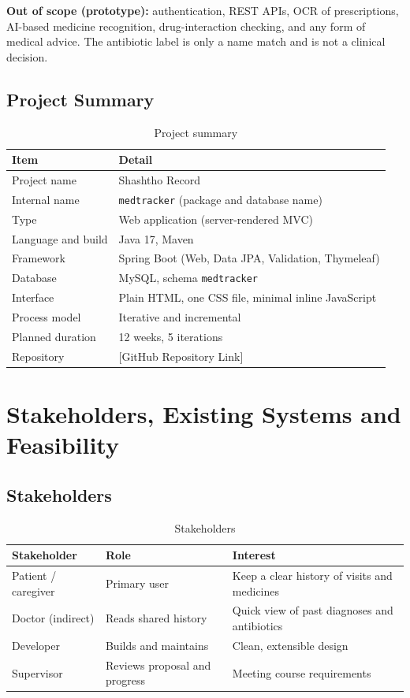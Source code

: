 \documentclass[11pt,a4paper]{article}
\begin{document}
\textbf{Out of scope (prototype):} authentication, REST APIs, OCR of prescriptions, AI-based medicine recognition, drug-interaction checking, and any form of medical advice. The antibiotic label is only a name match and is not a clinical decision.

\subsection{Project Summary}
\begin{table}[H]
\centering
\caption{Project summary}
\begin{tabularx}{\textwidth}{lY}
\toprule
\textbf{Item} & \textbf{Detail}\\
\midrule
Project name & Shashtho Record\\
Internal name & \texttt{medtracker} (package and database name)\\
Type & Web application (server-rendered MVC)\\
Language and build & Java 17, Maven\\
Framework & Spring Boot (Web, Data JPA, Validation, Thymeleaf)\\
Database & MySQL, schema \texttt{medtracker}\\
Interface & Plain HTML, one CSS file, minimal inline JavaScript\\
Process model & Iterative and incremental\\
Planned duration & 12 weeks, 5 iterations\\
Repository & [GitHub Repository Link]\\
\bottomrule
\end{tabularx}
\end{table}

\section{Stakeholders, Existing Systems and Feasibility}

\subsection{Stakeholders}
\begin{table}[H]
\centering
\caption{Stakeholders}
\begin{tabularx}{\textwidth}{lYY}
\toprule
\textbf{Stakeholder} & \textbf{Role} & \textbf{Interest}\\
\midrule
Patient / caregiver & Primary user & Keep a clear history of visits and medicines\\
Doctor (indirect) & Reads shared history & Quick view of past diagnoses and antibiotics\\
Developer & Builds and maintains & Clean, extensible design\\
Supervisor & Reviews proposal and progress & Meeting course requirements\\
\bottomrule
\end{tabularx}
\end{table}
\end{document}
